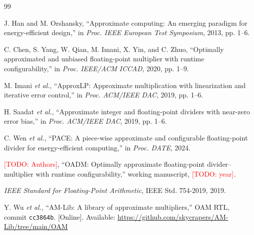 \documentclass[conference]{IEEEtran}
\newcommand{\todo}[1]{\textcolor{red}{[TODO: #1]}}
\begin{document}
\begin{thebibliography}{99}

J. Han and M. Orshansky, ``Approximate computing: An emerging paradigm for
energy-efficient design,'' in \emph{Proc. IEEE European Test Symposium}, 2013,
pp. 1--6.

C. Chen, S. Yang, W. Qian, M. Imani, X. Yin, and C. Zhuo, ``Optimally
approximated and unbiased floating-point multiplier with runtime
configurability,'' in \emph{Proc. IEEE/ACM ICCAD}, 2020, pp. 1--9.

M. Imani \emph{et al.}, ``ApproxLP: Approximate multiplication with
linearization and iterative error control,'' in \emph{Proc. ACM/IEEE DAC},
2019, pp. 1--6.

H. Saadat \emph{et al.}, ``Approximate integer and floating-point dividers with
near-zero error bias,'' in \emph{Proc. ACM/IEEE DAC}, 2019, pp. 1--6.

C. Wen \emph{et al.}, ``PACE: A piece-wise approximate and configurable
floating-point divider for energy-efficient computing,'' in
\emph{Proc. DATE}, 2024.

\todo{Authors}, ``OADM: Optimally approximate floating-point
divider--multiplier with runtime configurability,'' working manuscript,
\todo{year}.

\emph{IEEE Standard for Floating-Point Arithmetic}, IEEE Std. 754-2019, 2019.

Y. Wu \emph{et al.}, ``AM-Lib: A library of approximate multipliers,'' OAM RTL,
commit \texttt{cc3864b}. [Online]. Available:
\url{https://github.com/skycrapers/AM-Lib/tree/main/OAM}

\end{thebibliography}
\end{document}
